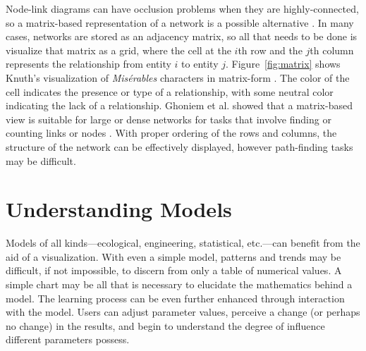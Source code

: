 Node-link diagrams can have occlusion problems when they are highly-connected, so a matrix-based representation of a network is a possible alternative \cite{heer2010}.  In many cases, networks are stored as an adjacency matrix, so all that needs to be done is visualize that matrix as a grid, where the cell at the $i$th row and the $j$th column represents the relationship from entity $i$ to entity $j$.  Figure~\ref{fig:matrix} shows Knuth's visualization of \textit{Mis\'erables} characters in matrix-form \cite{knuth1993}.  The color of the cell indicates the presence or type of a relationship, with some neutral color indicating the lack of a relationship.  Ghoniem et al. showed that a matrix-based view is suitable for large or dense networks for tasks that involve finding or counting links or nodes \cite{ghoniem2004}.  With proper ordering of the rows and columns, the structure of the network can be effectively displayed, however path-finding tasks may be difficult.

\section{Understanding Models}

Models of all kinds---ecological, engineering, statistical, etc.---can benefit from the aid of a visualization.  With even a simple model, patterns and trends may be difficult, if not impossible, to discern from only a table of numerical values.  A simple chart may be all that is necessary to elucidate the mathematics behind a model.  The learning process can be even further enhanced through interaction with the model.  Users can adjust parameter values, perceive a change (or perhaps no change) in the results, and begin to understand the degree of influence different parameters possess.


